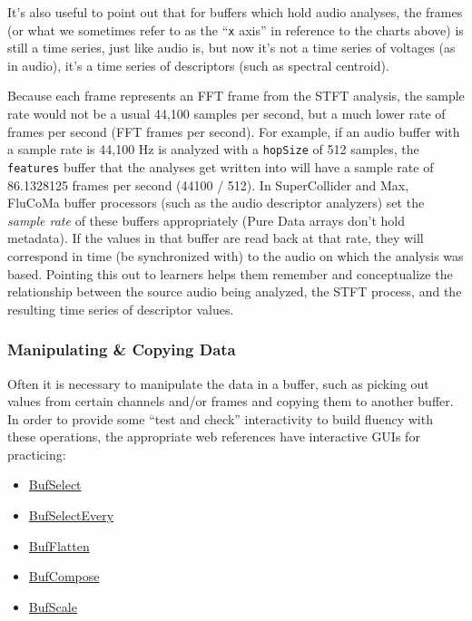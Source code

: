 \documentclass{article}
\providecommand{\tightlist}{%
  \setlength{\itemsep}{0pt}\setlength{\parskip}{0pt}}
\begin{document}
It's also useful to point out that for buffers which hold audio analyses,
the frames (or what we sometimes refer to as the ``\texttt{x} axis'' in
reference to the charts above) is still a time series, just like audio
is, but now it's not a time series of voltages (as in audio), it's a
time series of descriptors (such as spectral centroid).

Because each frame represents an FFT frame from the STFT analysis, the
sample rate would not be a usual 44,100 samples per second, but a much
lower rate of frames per second (FFT frames per second). For example, if
an audio buffer with a sample rate is 44,100 Hz is analyzed with a
\texttt{hopSize} of 512 samples, the \texttt{features} buffer that the
analyses get written into will have a sample rate of 86.1328125 frames
per second (44100 / 512). In SuperCollider and Max, FluCoMa buffer
processors (such as the audio descriptor analyzers) set the \emph{sample
rate} of these buffers appropriately (Pure Data arrays don't hold
metadata). If the values in that buffer are read back at that rate, they
will correspond in time (be synchronized with) to the audio on which the
analysis was based. Pointing this out to learners helps them remember and conceptualize the relationship between the source audio being analyzed, the STFT process, and the resulting time series of descriptor values.

\subsubsection{Manipulating \& Copying Data}

Often it is necessary to manipulate the data in a buffer, such as picking
out values from certain channels and/or frames and copying them to another
buffer. In order to provide some ``test and check'' interactivity to build
fluency with these operations, the appropriate web references have
interactive GUIs for practicing:

\begin{itemize}
\tightlist
\item
  \href{https://learn.flucoma.org/reference/bufselect/}{BufSelect}
\item
  \href{https://learn.flucoma.org/reference/bufselectevery/}{BufSelectEvery}
\item
  \href{https://learn.flucoma.org/reference/bufflatten/}{BufFlatten}
\item
  \href{https://learn.flucoma.org/reference/bufcompose/}{BufCompose}
\item
  \href{https://learn.flucoma.org/reference/bufscale/}{BufScale}
\end{itemize}
\end{document}
